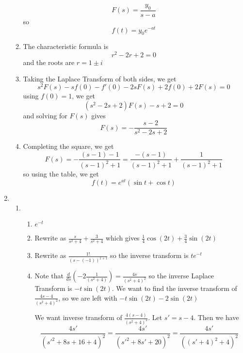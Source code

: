 \documentclass{article}
\begin{document}
\begin{enumerate}
\begin{enumerate}
\begin{equation}
        F(s) = \frac{y_0}{s-a}
    \end{equation}
    so 
    \begin{equation}
        f(t) = y_0e^{-at}
    \end{equation}
    \item The characteristic formula is 
    \begin{equation}
        r^2 - 2r + 2 = 0
    \end{equation}
    and the roots are $r = 1 \pm i$
    \item Taking the Laplace Transform of both sides, we get
    $$s^2F(s)-sf(0)-f'(0) - 2sF(s) + 2f(0) + 2F(s) = 0$$
    using $f(0)=1$, we get
    $$(s^2-2s+2)F(s) - s + 2 = 0$$
    and solving for $F(s)$ gives
    $$F(s) = -\frac{s-2}{s^2-2s+2}$$
    \item Completing the square, we get
    \begin{equation}
        F(s) = -\frac{(s-1)-1}{(s-1)^2+1} = \frac{-(s-1)}{(s-1)^2+1} + \frac{1}{(s-1)^2+1}
    \end{equation}
    so using the table, we get 
    \begin{equation}
        f(t) = e^{at}(\sin t + \cos t)
    \end{equation}
\end{enumerate}
\item \begin{enumerate}
    \item \begin{enumerate}
        \item $e^{-t}$
        \item Rewrite as $\frac{s}{s^2 + 4} + \frac{3}{s^2 + 4}$ which gives $\frac{1}{4}\cos(2t) + \frac{3}{4}\sin(2t)$
        \item Rewrite as $\frac{1!}{(s-(-1))^{1+1}}$ so the inverse transform is $te^{-t}$
        \item Note that $\frac{d}{ds}\left(-2\frac{1}{(s^2+4)}\right) = \frac{4s}{(s^2+4)^2}$ so the inverse Laplace Transform is $-t\sin(2t).$ We want to find the inverse transform of $\frac{4s-4}{(s^2+4)^2}$, so we are left with $-t\sin(2t)-2\sin(2t)$
        
        We want inverse transform of $\frac{4(s-4)}{(s^2+4)^2}.$ Let $s'=s-4$. Then we have
        \begin{equation}
            \frac{4s'}{(s'^2+8s+16+4)^2} = \frac{4s'}{(s'^2+8s'+20)^2} = \frac{4s'}{((s'+4)^2+4)^2}
        \end{equation}
    \end{enumerate}
\end{enumerate}
\end{enumerate}
\end{document}

